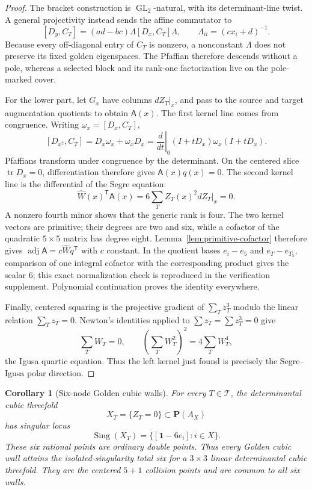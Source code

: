 \documentclass[11pt]{article}
\newtheorem{corollary}[theorem]{Corollary}
\theoremstyle{definition}
\theoremstyle{remark}
\newcommand{\cT}{\mathcal T}
\begin{document}
\begin{proof}
The bracket construction is \(\operatorname{GL}_2\)-natural, with its
determinant-line twist.  A general projectivity instead sends the affine
commutator to
\[
 [D_y,C_T]=(ad-bc)\Lambda[D_x,C_T]\Lambda,
 \qquad \Lambda_{ii}=(cx_i+d)^{-1}.
\]
Because every off-diagonal entry of \(C_T\) is nonzero, a nonconstant
\(\Lambda\) does not preserve its fixed golden eigenspaces.  The Pfaffian
therefore descends without a pole, whereas a selected block and its
rank-one factorization live on the pole-marked cover.

For the lower part, let \(G_x\) have columns
\(dZ_T|_x\), and pass to the source and target augmentation quotients to
obtain \(\mathsf A(x)\).  The first kernel line comes from congruence.
Writing \(\omega_x=[D_x,C_T]\),
\[
 [D_{x^2},C_T]=D_x\omega_x+\omega_xD_x
 =\left.\frac d{dt}\right|_{0}
 (I+tD_x)\omega_x(I+tD_x).
\]
Pfaffians transform under congruence by the determinant.  On the centered
slice \(\operatorname{tr}D_x=0\), differentiation therefore gives
\(\mathsf A(x)q(x)=0\).  The second kernel line is the differential of
the Segre equation:
\[
 \widehat W(x)^{\mathsf T}\mathsf A(x)
 =6\sum_TZ_T(x)^2dZ_T|_x=0.
\]
A nonzero fourth minor shows that the generic rank is four.  The two kernel
vectors are primitive; their degrees are two and six, while a cofactor of
the quadratic \(5\times5\) matrix has degree eight.  Lemma~\ref{lem:primitive-cofactor}
therefore gives
\(\operatorname{adj}\mathsf A=c\widehat Wq^{\mathsf T}\) with \(c\)
constant.  In the quotient bases
\(e_i-e_5\) and \(e_T-e_{T_5}\), comparison of one integral cofactor
with the corresponding product gives the scalar \(6\); this exact
normalization check is reproduced in the verification supplement.
Polynomial continuation proves the identity everywhere.

Finally, centered squaring is the projective gradient of
\(\sum_Tz_T^3\) modulo the linear relation \(\sum_Tz_T=0\).  Newton's
identities applied to \(\sum z_T=\sum z_T^3=0\) give
\[
 \sum_TW_T=0,
 \qquad \left(\sum_TW_T^2\right)^2=4\sum_TW_T^4,
\]
the Igusa quartic equation.  Thus the left kernel just found is precisely
the Segre--Igusa polar direction.
\end{proof}

\begin{corollary}[Six-node Golden cubic walls]
\label{cor:golden-cubic-wall-nodes}
For every \(T\in\cT\), the determinantal cubic threefold
\[
 X_T=\{Z_T=0\}\subset\mathbf P(A_X)
\]
has singular locus
\[
 \operatorname{Sing}(X_T)
 =\{[\mathbf1-6e_i]:i\in X\}.
\]
These six rational points are ordinary double points.  Thus every Golden
cubic wall attains the isolated-singularity total six for a
\(3\times3\) linear determinantal cubic threefold.  They are the centered
\(5+1\) collision points and are common to all six walls.
\end{corollary}
\end{document}
